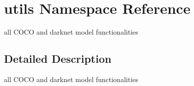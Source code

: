 \hypertarget{namespaceutils}{}\section{utils Namespace Reference}
\label{namespaceutils}


all C\+O\+CO and darknet model functionalities  




\subsection{Detailed Description}
all C\+O\+CO and darknet model functionalities 